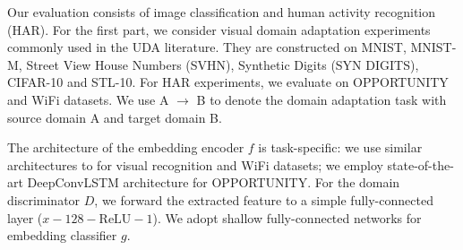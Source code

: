 Our evaluation consists of image classification and human activity recognition (HAR). For the first part, we consider visual domain adaptation experiments commonly used in the UDA literature. They are constructed on MNIST, MNIST-M, Street View House Numbers (SVHN), Synthetic Digits (SYN DIGITS), CIFAR-10 and STL-10. For HAR experiments, we evaluate on OPPORTUNITY \cite{ordonez2016deep} and WiFi \cite{yousefi2017survey} datasets. We use A $\rightarrow$ B to denote the domain adaptation task with source domain A and target domain B. 


The architecture of the embedding encoder $f$ is task-specific: we use similar architectures to \cite{shu2018dirt} for visual recognition and WiFi datasets; we employ state-of-the-art DeepConvLSTM architecture \cite{ordonez2016deep} for OPPORTUNITY. For the domain discriminator $D$, we forward the extracted feature to a simple fully-connected layer ($x-128-\text{ReLU}-1$). We adopt shallow fully-connected networks for embedding classifier $g$.




